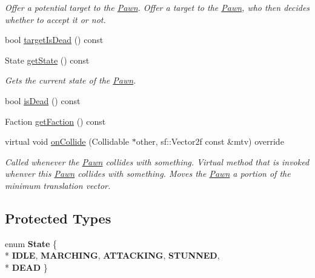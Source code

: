 \begin{DoxyCompactItemize}
\begin{DoxyCompactList}\small\item\em Offer a potential target to the \hyperlink{class_pawn}{Pawn}. Offer a target to the \hyperlink{class_pawn}{Pawn}, who then decides whether to accept it or not. \end{DoxyCompactList}\item 
bool \hyperlink{class_pawn_a4c5bda155d7b73b8fe1f63d9aad423dc}{target\+Is\+Dead} () const 
\item 
State \hyperlink{class_pawn_a15e50004263b9935f2cd3377c6d4f8a8}{get\+State} () const 
\begin{DoxyCompactList}\small\item\em Gets the current state of the \hyperlink{class_pawn}{Pawn}. \end{DoxyCompactList}\item 
bool \hyperlink{class_pawn_a9b6dd19cb4c82719d6a9fcc2d9bbee8b}{is\+Dead} () const 
\item 
Faction \hyperlink{class_pawn_a574b90f999b689bb42555791b86dc6c8}{get\+Faction} () const 
\item 
virtual void \hyperlink{class_pawn_a166813524eb441632550e72d77c2c5a9}{on\+Collide} (Collidable $\ast$other, sf\+::\+Vector2f const \&mtv) override
\begin{DoxyCompactList}\small\item\em Called whenever the \hyperlink{class_pawn}{Pawn} collides with something. Virtual method that is invoked whenver this \hyperlink{class_pawn}{Pawn} collides with something. Moves the \hyperlink{class_pawn}{Pawn} a portion of the minimum translation vector. \end{DoxyCompactList}\end{DoxyCompactItemize}
\subsection*{Protected Types}
\begin{DoxyCompactItemize}
\item 
\hypertarget{class_pawn_af8c8816fa179d6aed5aeb1d14514675c}{}enum {\bfseries State} \{ \\*
{\bfseries I\+D\+L\+E}, 
{\bfseries M\+A\+R\+C\+H\+I\+N\+G}, 
{\bfseries A\+T\+T\+A\+C\+K\+I\+N\+G}, 
{\bfseries S\+T\+U\+N\+N\+E\+D}, 
\\*
{\bfseries D\+E\+A\+D}
 \}\label{class_pawn_af8c8816fa179d6aed5aeb1d14514675c}

\end{DoxyCompactItemize}
